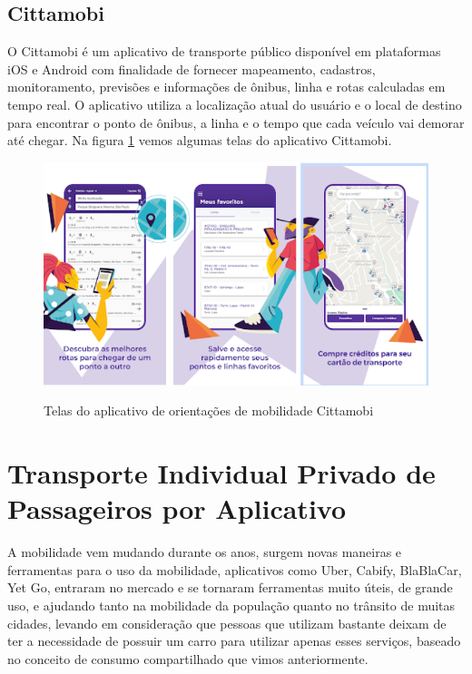 
\subsection{Cittamobi}
O Cittamobi é um aplicativo de transporte público disponível em plataformas iOS e Android com finalidade de fornecer mapeamento, cadastros, monitoramento, previsões e informações de ônibus, linha e rotas calculadas em tempo real. O aplicativo utiliza a localização atual do usuário e o local de destino para encontrar o ponto de ônibus, a linha e o tempo que cada veículo vai demorar até chegar. Na figura \ref{fig:cittamobi} vemos algumas telas do aplicativo Cittamobi.

\begin{figure}[!hbtp]
	\centering
	\caption{Telas do aplicativo de orientações de mobilidade Cittamobi}
	\includegraphics[width=0.4	\textwidth]{./04-figuras/cittamobi/cittamobi.png}
	\label{fig:cittamobi}
\end{figure}




\section{Transporte Individual Privado de Passageiros por Aplicativo}

A mobilidade vem mudando durante os anos, surgem novas maneiras e ferramentas para o uso da mobilidade, aplicativos como Uber, Cabify, BlaBlaCar, Yet Go, entraram no mercado e se tornaram ferramentas muito úteis, de grande uso, e ajudando tanto na mobilidade da população quanto no trânsito de muitas cidades, levando em consideração que pessoas que utilizam bastante deixam de ter a necessidade de possuir um carro para utilizar apenas esses serviços, baseado no conceito de consumo compartilhado que vimos anteriormente.

